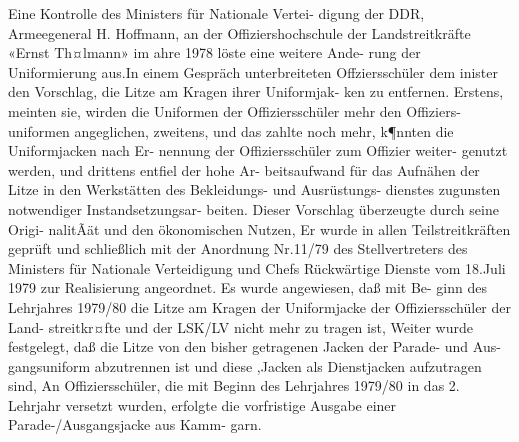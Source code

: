 Eine Kontrolle des Ministers für Nationale Vertei-
digung der DDR, Armeegeneral H. Hoffmann, an
der Offiziershochschule der Landstreitkräfte «Ernst
Th¤lmann» im ahre 1978 löste eine weitere Ande-
rung der Uniformierung aus.In einem Gespräch
unterbreiteten Offziersschüler dem inister den
Vorschlag, die Litze am Kragen ihrer Uniformjak-
ken zu entfernen. Erstens, meinten sie, wirden die
Uniformen der Offiziersschüler mehr den Offiziers-
uniformen angeglichen, zweitens, und das zahlte
noch mehr, k¶nnten die Uniformjacken nach Er-
nennung der Offiziersschüler zum Offizier weiter-
genutzt werden, und drittens entfiel der hohe Ar-
beitsaufwand für das Aufnähen der Litze in den
Werkstätten des Bekleidungs- und Ausrüstungs-
dienstes zugunsten notwendiger Instandsetzungsar-
beiten.
Dieser Vorschlag überzeugte durch seine Origi-
nalitÃät und den ökonomischen Nutzen, Er wurde in
allen Teilstreitkräften geprüft und schließlich mit
der Anordnung Nr.11/79 des Stellvertreters des
Ministers für Nationale Verteidigung und Chefs
Rückwärtige Dienste vom 18.Juli 1979 zur Realisierung angeordnet. Es wurde angewiesen, daß mit Be-
ginn des Lehrjahres 1979/80 die Litze am Kragen
der Uniformjacke der Offiziersschüler der Land-
streitkr¤fte und der LSK/LV nicht mehr zu tragen
ist, Weiter wurde festgelegt, daß die Litze von den
bisher getragenen Jacken der Parade- und Aus-
gangsuniform abzutrennen ist und diese ,Jacken als
Dienstjacken aufzutragen sind, An Offiziersschüler,
die mit Beginn des Lehrjahres 1979/80 in das
2. Lehrjahr versetzt wurden, erfolgte die vorfristige
Ausgabe einer Parade-/Ausgangsjacke aus Kamm-
garn.